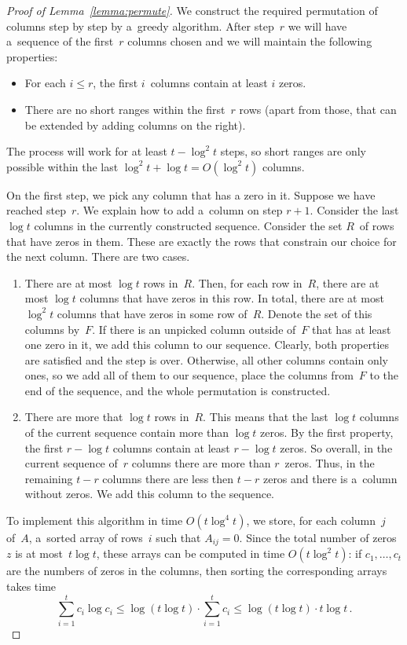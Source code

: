 \begin{proof}[Proof of Lemma~\ref{lemma:permute}]
We construct the required permutation of columns step by step by a~greedy
algorithm. After step~$r$ we will have a~sequence of the first~$r$ columns
chosen and we will maintain the following properties:
\begin{itemize}
\item For each $i \leq r$, the first $i$~columns contain at least $i$ zeros.
\item There are no short ranges within the first~$r$ rows (apart from those,
that can be extended by adding columns on the right).
\end{itemize}
The process will work for at least $t - \log^2 t$ steps, so short ranges are
only possible within the last $\log^2 t + \log t = O(\log^2 t)$ columns.

On the first step, we pick any column that has a zero in it. Suppose
we have reached step~$r$. We explain how to add a~column on
step $r+1$. Consider the last $\log t$ columns in the currently
constructed sequence. Consider the set $R$~of rows that have
zeros in them. These are exactly the rows that constrain our
choice for the next column. There are two cases.
\begin{enumerate}
\item There are at most $\log t$ rows in~$R$. Then, for each row in~$R$, there
are at most $\log t$ columns that have zeros in this row. In total, there are at
most $\log^2 t$ columns that have zeros in some row of~$R$. Denote the set of
this columns by~$F$. If there is an unpicked column outside of~$F$ that has at
least one zero in it, we add this column to our sequence. Clearly, both
properties are satisfied and the step is over. Otherwise, all other columns
contain only ones, so we add all of them to our sequence, place the columns
from~$F$ to the end of the sequence, and the whole permutation is constructed.
\item There are more that $\log t$ rows in~$R$. This means that the last
$\log t$ columns of the current sequence contain more than $\log t$ zeros. By
the first property, the first $r - \log t$ columns contain at least $r - \log t$
zeros. So overall, in the current sequence of~$r$ columns there are more than
$r$~zeros. Thus, in the remaining $t-r$ columns there are less then $t-r$ zeros
and there is a~column without zeros. We add this column to the sequence.
\end{enumerate}


To implement this algorithm in time $O(t\log^{4}t)$, we store, for each
column~$j$ of~$A$, a~sorted array of rows~$i$ such that $A_{ij}=0$. Since the
total number of zeros~$z$ is at most~$t\log t$, these arrays can be computed in
time $O(t\log^2t)$: if $c_1, \dotsc, c_t$ are the numbers of zeros in the
columns, then sorting the corresponding arrays takes time
\[\sum_{i=1}^{t}c_i \log c_i \le \log(t \log t) \cdot \sum_{i=1}^{t}c_i \le \log(t \log t) \cdot t\log t \, .\]


\end{proof}
